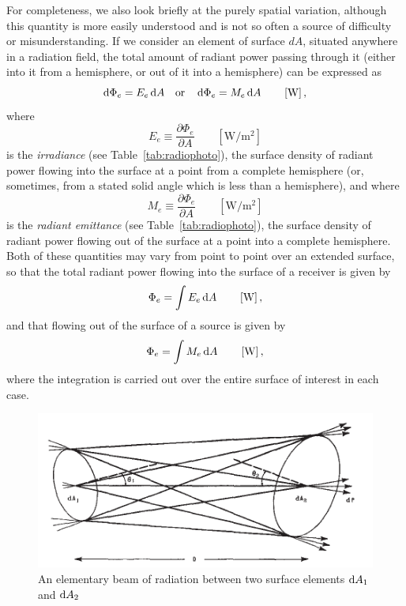 For completeness, we also look briefly at the purely spatial variation, although
this quantity is more easily understood and is not so often a source of
difficulty
or misunderstanding. If we consider an element of surface $dA$, situated
anywhere
in a radiation field, the total amount of radiant power passing through it
(either
into it from a hemisphere, or out of it into a hemisphere) can be expressed as
\begin{equation*}
\mathop{}\!\mathrm{d}\Phi_e = E_e \mathop{}\!\mathrm{d} A \quad \textrm{or} \quad \mathop{}\!\mathrm{d}\Phi_e = M_e \mathop{}\!\mathrm{d} A
\qquad \left[\si{\watt}\right],
\end{equation*}
where
\begin{equation}\label{eqn:nicodemus4}
E_e \equiv \frac{\partial \Phi_e}{\partial A}
\qquad \left[\si{\watt\per\square\meter}\right]
\end{equation}
is the \textsl{irradiance} (see Table~\ref{tab:radiophoto}), the surface density
of radiant power flowing into the surface at a point from a complete hemisphere
(or, sometimes, from a stated solid angle which is less than a hemisphere), and
where
\begin{equation}\label{eqn:nicodemus5}
M_e \equiv \frac{\partial \Phi_e}{\partial A}
\qquad \left[\si{\watt\per\square\meter}\right]
\end{equation}
is the \textsl{radiant emittance} (see Table~\ref{tab:radiophoto}), the surface
density of radiant power flowing out of the surface at a point into a complete
hemisphere. Both of these quantities may vary from point to point over an
extended
surface, so that the total radiant power flowing into the surface of a receiver
is given by
\begin{equation}
\Phi_e = \int E_e \mathop{}\!\mathrm{d} A
\qquad \left[\si{\watt}\right],
\end{equation}
and that flowing out of the surface of a source is given by
\begin{equation}
\Phi_e = \int M_e \mathop{}\!\mathrm{d} A
\qquad \left[\si{\watt}\right],
\end{equation}
where the integration is carried out over the entire surface of interest in each case.

\begin{figure}
\begin{center}
\includegraphics{figures/nicodemus1963-fig2.pdf}
\end{center}
\caption{An elementary beam of radiation between two surface elements $\mathop{}\!\mathrm{d} A_1$ and $\mathop{}\!\mathrm{d} A_2$}
\label{fig:nicodemus2}
\end{figure}

